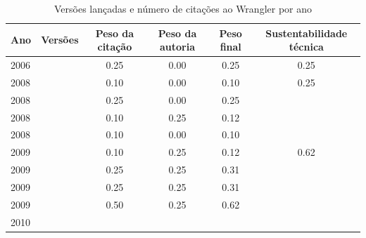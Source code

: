 \begin{table}[H]
\caption{Versões lançadas e número de citações ao Wrangler por ano}
\centering
\begin{tabular}{| l | c | c | c | c | c |}
  \hline
  Ano & Versões & Peso da citação & Peso da autoria & Peso final & Sustentabilidade técnica \\
  \hline
            2006
          &
          
          &
          0.25
          &
          0.00
          &
          0.25
          &
            {\color{red} 0.25}
          \\
\hline
            2008
          &
          
          &
          0.10
          &
          0.00
          &
          0.10
          &
            {\color{red} 0.25}
          \\
            2008
          &
          
          &
          0.25
          &
          0.00
          &
          0.25
          &
          \\
            2008
          &
          
          &
          0.10
          &
          0.25
          &
          0.12
          &
          \\
            2008
          &
          
          &
          0.10
          &
          0.00
          &
          0.10
          &
          \\
\hline
            2009
          &
          
          &
          0.10
          &
          0.25
          &
          0.12
          &
            {\color{blue} 0.62}
          \\
            2009
          &
          
          &
          0.25
          &
          0.25
          &
          0.31
          &
          \\
            2009
          &
          
          &
          0.25
          &
          0.25
          &
          0.31
          &
          \\
            2009
          &
          
          &
          0.50
          &
          0.25
          &
          0.62
          &
          \\
\hline
            2010
          &
          

\end{tabular}
\end{table}
